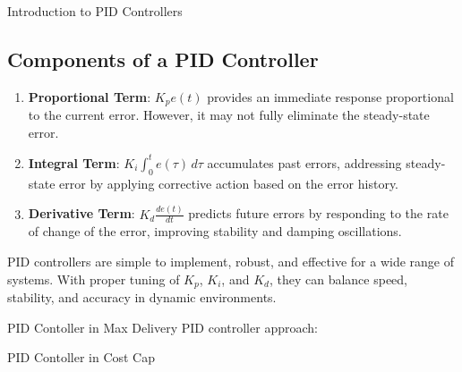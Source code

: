 \documentclass[../main.tex]{subfiles}
\begin{document}
\begin{section}{Introduction to PID Controllers}
	\subsection*{Components of a PID Controller}
	\begin{enumerate}
		\item \textbf{Proportional Term}: \(K_p e(t)\) provides an immediate response proportional to the current error. However, it may not fully eliminate the steady-state error.
		\item \textbf{Integral Term}: \(K_i \int_{0}^{t} e(\tau) \, d\tau\) accumulates past errors, addressing steady-state error by applying corrective action based on the error history.
		\item \textbf{Derivative Term}: \(K_d \frac{d e(t)}{dt}\) predicts future errors by responding to the rate of change of the error, improving stability and damping oscillations.
	\end{enumerate}
	PID controllers are simple to implement, robust, and effective for a wide range of systems. With proper tuning of \(K_p\), \(K_i\), and \(K_d\), they can balance speed, stability, and accuracy in dynamic environments.
	\end{section}




	\begin{section}{PID Contoller in Max Delivery}
		PID controller approach: \cite{zhang2016feedback}
		
	\end{section}
	
	\begin{section}{PID Contoller in Cost Cap}
		
	\end{section}
	
	
\end{document}
